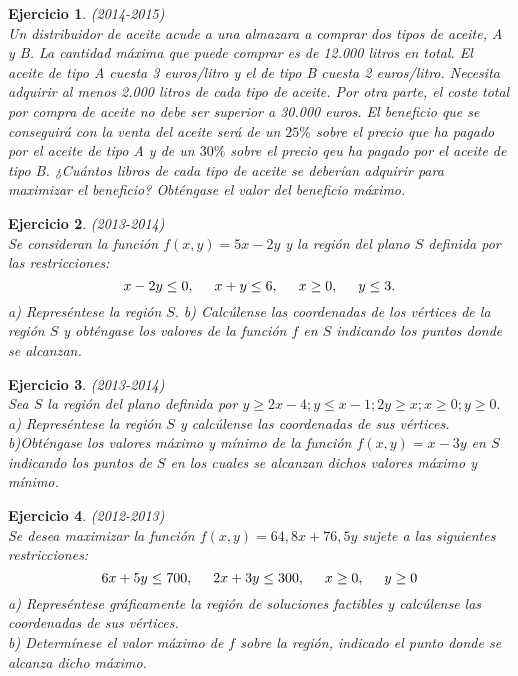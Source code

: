 \documentclass[12pt, a4paper]{amsart}
\newtheorem{ejer}{Ejercicio}
\begin{document}
\begin{ejer}\em (2014-2015)\\
Un distribuidor de aceite acude a una almazara a comprar dos tipos de aceite, A y B. La cantidad máxima que puede comprar es de 12.000 litros en total. El aceite de tipo A cuesta 3 euros/litro y el de tipo B cuesta 2 euros/litro. Necesita adquirir al menos 2.000 litros de cada tipo de aceite. Por otra parte, el coste total por compra de aceite no debe ser superior a 30.000 euros. El beneficio que se conseguirá con la venta del aceite será de un $25\%$ sobre el precio que ha pagado por el aceite de tipo A y de un $30\%$ sobre el precio qeu ha pagado por el aceite de tipo B. ¿Cuántos libros de cada tipo de aceite se deberían adquirir para maximizar el beneficio? Obténgase el valor del beneficio máximo.
\end{ejer}


\begin{ejer}\em (2013-2014)\\
Se consideran la función $f(x,y)=5x-2y$ y la región del plano $S$ definida por las restricciones:
\[x-2y\leq 0,\hspace*{0.5cm} x+y\leq 6,\hspace*{0.5cm} x\geq 0,\hspace*{0.5cm} y\leq 3.\]
a) Represéntese la región $S.$
b) Calcúlense las coordenadas de los vértices de la región $S$ y obténgase los valores de la función $f$ en $S$ indicando los puntos donde se alcanzan.
\end{ejer}

\begin{ejer}\em  (2013-2014)\\
Sea $S$ la región del plano definida por
$y\geq 2x-4; y\leq x-1; 2y\geq x; x\geq 0; y\geq 0.$\\
a) Represéntese la región $S$ y calcúlense las coordenadas de sus vértices.\\
b)Obténgase los valores máximo y mínimo de la función $f(x,y)=x-3y$ en $S$ indicando los puntos de $S$ en los cuales se alcanzan dichos valores máximo y mínimo.
\end{ejer}

\begin{ejer}\em (2012-2013)\\
Se desea maximizar la función $f(x,y)=64,8x+76,5y$ sujete a las siguientes restricciones:
\[6x+5y\leq 700,\hspace*{0.5cm} 2x+3y\leq 300,\hspace*{0.5cm} x\geq 0,\hspace*{0.5cm} y\geq 0\]
a) Represéntese gráficamente la región de soluciones factibles y calcúlense las coordenadas de sus vértices.\\
b) Determínese el valor máximo de $f$ sobre la región, indicado el punto donde se alcanza dicho máximo.
\end{ejer}
\end{document}
